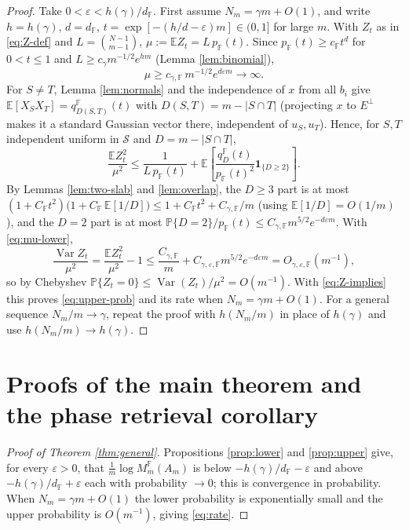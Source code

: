 \documentclass[10pt,a4paper]{amsart}
\newcommand{\F}{\mathbb{F}}
\newcommand{\PP}{\mathbb{P}}
\newcommand{\EE}{\mathbb{E}}
\newcommand{\cS}{\mathcal{S}}
\begin{document}
\begin{proof}
Take $0<\varepsilon<h(\gamma)/d_\F$. First assume $N_m=\gamma m+O(1)$, and write $h=h(\gamma)$,
$d=d_\F$, $t=\exp[-(h/d-\varepsilon)m]\in(0,1]$ for large $m$. With $Z_t$ as in \eqref{eq:Z-def} and
$L=\binom{N-1}{m-1}$, $\mu:=\EE Z_t=L\,p_\F(t)$. Since $p_\F(t)\ge c_\F t^d$ for $0<t\le1$ and
$L\ge c_\gamma m^{-1/2}e^{hm}$ (Lemma \ref{lem:binomial}),
\begin{equation}\label{eq:mu-lower}
  \mu\ge c_{\gamma,\F}\,m^{-1/2}e^{d\varepsilon m}\to\infty.
\end{equation}
For $S\ne T$, Lemma \ref{lem:normals} and the independence of $x$ from all $b_i$ give
$\EE[X_SX_T]=q_{D(S,T)}^\F(t)$ with $D(S,T)=m-|S\cap T|$ (projecting $x$ to $E^\perp$ makes it a
standard Gaussian vector there, independent of $u_S,u_T$). Hence, for $S,T$ independent uniform in
$\cS$ and $D=m-|S\cap T|$,
\begin{equation}\label{eq:second-moment}
  \frac{\EE Z_t^2}{\mu^2}
  \le \frac{1}{L\,p_\F(t)}+
       \EE\left[\frac{q_D^\F(t)}{p_\F(t)^2}\mathbf1_{\{D\ge2\}}\right].
\end{equation}
By Lemmas \ref{lem:two-slab} and \ref{lem:overlap}, the $D\ge3$ part is at most
$(1+C_\F t^2)\bigl(1+C_\F\,\EE[1/D]\bigr)\le 1+C_\F t^2+C_{\gamma,\F}/m$ (using
$\EE[1/D]=O(1/m)$), and the $D=2$ part is at most
$\PP\{D=2\}/p_\F(t)\le C_{\gamma,\F}m^{5/2}e^{-d\varepsilon m}$. With \eqref{eq:mu-lower},
\[
  \frac{\operatorname{Var} Z_t}{\mu^2}=\frac{\EE Z_t^2}{\mu^2}-1
  \le \frac{C_{\gamma,\F}}{m}+C_{\gamma,\varepsilon,\F}m^{5/2}e^{-d\varepsilon m}
  =O_{\gamma,\varepsilon,\F}(m^{-1}),
\]
so by Chebyshev $\PP\{Z_t=0\}\le \operatorname{Var}(Z_t)/\mu^2=O(m^{-1})$. With \eqref{eq:Z-implies}
this proves \eqref{eq:upper-prob} and its rate when $N_m=\gamma m+O(1)$. For a general sequence
$N_m/m\to\gamma$, repeat the proof with $h(N_m/m)$ in place of $h(\gamma)$ and use
$h(N_m/m)\to h(\gamma)$.
\end{proof}

\section{Proofs of the main theorem and the phase retrieval corollary}


\begin{proof}[Proof of Theorem \ref{thm:general}]
Propositions \ref{prop:lower} and \ref{prop:upper} give, for every $\varepsilon>0$, that
$\frac1m\log M_m^\F(A_m)$ is below $-h(\gamma)/d_\F-\varepsilon$ and above $-h(\gamma)/d_\F+\varepsilon$
each with probability $\to0$; this is convergence in probability. When $N_m=\gamma m+O(1)$ the lower
probability is exponentially small and the upper probability is $O(m^{-1})$, giving \eqref{eq:rate}.
\end{proof}
\end{document}
